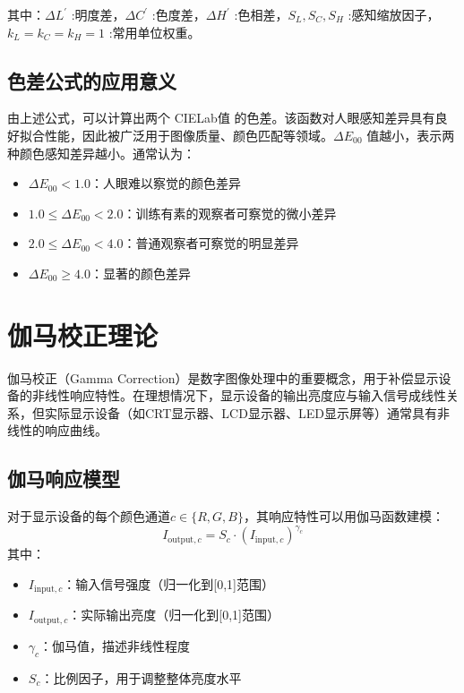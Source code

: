 其中：$\Delta L^{'}$ :明度差，$\Delta C^{'}$ :色度差，$\Delta H^{'}$ :色相差，$S_{L},S_{C},S_{H}$ :感知缩放因子，$k_{L}=k_{C}=k_{H}=1$ :常用单位权重。

\subsection[\hspace{-2pt}色差公式的应用意义]{{\heiti{} \hspace{-8pt}色差公式的应用意义}}\label{subsection2: 色差公式的应用意义}

由上述公式，可以计算出两个 CIELab值 的色差。该函数对人眼感知差异具有良好拟合性能，因此被广泛用于图像质量、颜色匹配等领域。$\Delta E_{00}$ 值越小，表示两种颜色感知差异越小。通常认为：
\begin{itemize}
    \item $\Delta E_{00} < 1.0$：人眼难以察觉的颜色差异
    \item $1.0 \leq \Delta E_{00} < 2.0$：训练有素的观察者可察觉的微小差异
    \item $2.0 \leq \Delta E_{00} < 4.0$：普通观察者可察觉的明显差异
    \item $\Delta E_{00} \geq 4.0$：显著的颜色差异
\end{itemize}

\section[\hspace{-2pt}伽马校正理论]{{\heiti{} \hspace{-8pt}伽马校正理论}}\label{section2: 伽马校正理论}

伽马校正（Gamma Correction）是数字图像处理中的重要概念，用于补偿显示设备的非线性响应特性。在理想情况下，显示设备的输出亮度应与输入信号成线性关系，但实际显示设备（如CRT显示器、LCD显示器、LED显示屏等）通常具有非线性的响应曲线。\cite{gamma_correction}

\subsection[\hspace{-2pt}伽马响应模型]{{\heiti{} \hspace{-8pt}伽马响应模型}}\label{subsection2: 伽马响应模型}

对于显示设备的每个颜色通道$c \in \{R,G,B\}$，其响应特性可以用伽马函数建模：
\begin{equation}
I_{\text{output},c} = S_c \cdot (I_{\text{input},c})^{\gamma_c}
\end{equation}
其中：
\begin{itemize}
    \item $I_{\text{input},c}$：输入信号强度（归一化到[0,1]范围）
    \item $I_{\text{output},c}$：实际输出亮度（归一化到[0,1]范围）
    \item $\gamma_c$：伽马值，描述非线性程度
    \item $S_c$：比例因子，用于调整整体亮度水平
\end{itemize}

